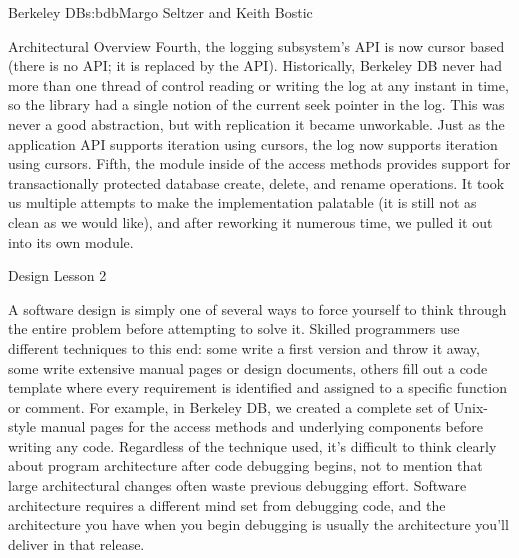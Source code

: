 \begin{aosachapter}{Berkeley DB}{s:bdb}{Margo Seltzer and Keith Bostic}
\begin{aosasect1}{Architectural Overview}
Fourth, the logging subsystem's API is now cursor based (there is no
 API; it is replaced by the  API).
Historically, Berkeley DB never had more than one thread of control
reading or writing the log at any instant in time, so the library had
a single notion of the current seek pointer in the log.  This was
never a good abstraction, but with replication it became
unworkable. Just as the application API supports iteration using
cursors, the log now supports iteration using cursors.  Fifth, the
 module inside of the access methods provides support for
transactionally protected database create, delete, and rename
operations. It took us multiple attempts to make the implementation
palatable (it is still not as clean as we would like), and after
reworking it numerous time, we pulled it out into its own module. 

\begin{aosabox}{Design Lesson 2}

A software design is simply one of several ways to force yourself to
think through the entire problem before attempting to solve it.
Skilled programmers use different techniques to this end: some write a
first version and throw it away, some write extensive manual pages or
design documents, others fill out a code template where every
requirement is identified and assigned to a specific function or
comment. For example, in Berkeley DB, we created a complete set of
Unix-style manual pages for the access methods and underlying
components before writing any code. Regardless of the technique used,
it's difficult to think clearly about program architecture after code
debugging begins, not to mention that large architectural changes
often waste previous debugging effort. Software architecture requires
a different mind set from debugging code, and the architecture you
have when you begin debugging is usually the architecture you'll
deliver in that release.

\end{aosabox}



\end{aosasect1}
\end{aosachapter}
